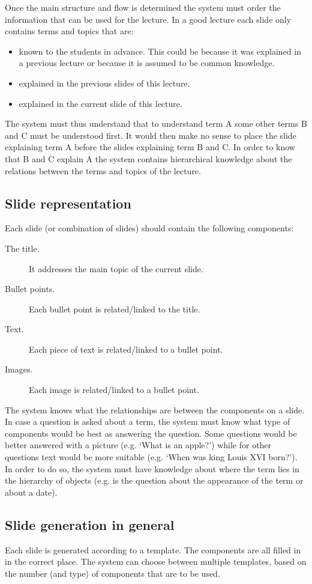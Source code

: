 \documentclass[11pt]{article}
\begin{document}
Once the main structure and flow is determined the system must order the information that can be used for the lecture. In a good lecture each slide only contains terms and topics that are:
\begin{itemize}
\item known to the students in advance. This could be because it was explained in a previous lecture or because it is assumed to be common knowledge.
\item explained in the previous slides of this lecture.
\item explained in the current slide of this lecture.
\end{itemize}
The system must thus understand that to understand term A some other terms B and C must be understood first. It would then make no sense to place the slide explaining term A before the slides explaining term B and C. In order to know that B and C explain A the system contains hierarchical knowledge about the relations between the terms and topics of the lecture.

\subsection{Slide representation}
Each slide (or combination of slides) should contain the following components:
\begin{description}
\item[The title.] It addresses the main topic of the current slide.
\item[Bullet points.] Each bullet point is related/linked to the title. 
\item[Text.] Each piece of text is related/linked to a bullet point.
\item[Images.] Each image is related/linked to a bullet point.
\end{description}
The system knows what the relationships are between the components on a slide. In case a question is asked about a term, the system must know what type of components would be best as answering the question. Some questions would be better answered with a picture (e.g. `What is an apple?') while for other questions text would be more suitable (e.g. `When was king Louis XVI born?'). In order to do so, the system must have knowledge about where the term lies in the hierarchy of objects (e.g. is the question about the appearance of the term or about a date).

\subsection{Slide generation in general}
Each slide is generated according to a template. The components are all filled in in the correct place. The system can choose between multiple templates, based on the number (and type) of components that are to be used. 
\end{document}
